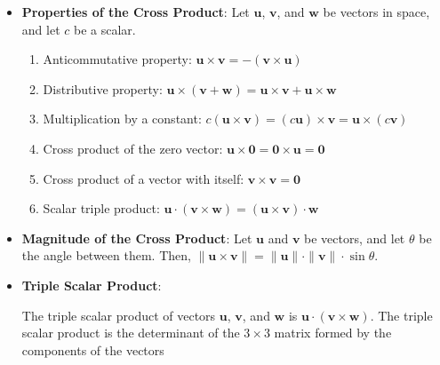 \documentclass{report}
\begin{document}
\begin{itemize}
    \item \textbf{Properties of the Cross Product}:
        Let $\mathbf{u}$, $\mathbf{v}$, and $\mathbf{w}$ be vectors in space, and let $c$ be a scalar.
        \begin{enumerate}
            \item Anticommutative property: $\mathbf{u} \times \mathbf{v} = -(\mathbf{v} \times \mathbf{u})$
            \item Distributive property: $\mathbf{u} \times (\mathbf{v} + \mathbf{w}) = \mathbf{u} \times \mathbf{v} + \mathbf{u} \times \mathbf{w}$
            \item Multiplication by a constant: $c(\mathbf{u} \times \mathbf{v}) = (c\mathbf{u}) \times \mathbf{v} = \mathbf{u} \times (c\mathbf{v})$
            \item Cross product of the zero vector: $\mathbf{u} \times \mathbf{0} = \mathbf{0} \times \mathbf{u} = \mathbf{0}$
            \item Cross product of a vector with itself: $\mathbf{v} \times \mathbf{v} = \mathbf{0}$
            \item Scalar triple product: $\mathbf{u} \cdot (\mathbf{v} \times \mathbf{w}) = (\mathbf{u} \times \mathbf{v}) \cdot \mathbf{w}$
        \end{enumerate}
    \item \textbf{Magnitude of the Cross Product}:
        Let $\mathbf{u}$ and $\mathbf{v}$ be vectors, and let $\theta$ be the angle between them. Then, $\|\mathbf{u} \times \mathbf{v}\| = \|\mathbf{u}\| \cdot \|\mathbf{v}\| \cdot \sin \theta.$
    \item \textbf{Triple Scalar Product}:

        The triple scalar product of vectors $\mathbf{u}$, $\mathbf{v}$, and $\mathbf{w}$ is $\mathbf{u} \cdot (\mathbf{v} \times \mathbf{w})$.
        \bigbreak \noindent 
        The triple scalar product is the determinant of the  $3\times 3$ matrix formed by the components of the vectors


\end{itemize}
\end{document}
